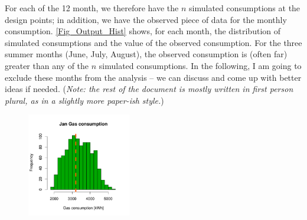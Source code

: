 \documentclass[a4paper, 12pt]{article}
\begin{document}
For each of the 12 month, we therefore have the $n$ simulated consumptions at the design points; in addition, we have the observed piece of data for the monthly consumption.
\autoref{Fig_Output_Hist} shows, for each month, the distribution of simulated consumptions and the value of the observed consumption.
For the three summer months (June, July, August), the observed consumption is (often far) greater than any of the $n$ simulated consumptions. In the following, I am going to exclude these months from the analysis -- we can discuss and come up with better ideas if needed. ({\small \it Note: the rest of the document is mostly written in first person plural, as in a slightly more paper-ish style.})

\newcommand{\scale}{12.2em}
\begin{figure}
\centering
 \includegraphics[width=\scale]{Simulation_histograms/Batch_2_Only/Gas_Runs/Jan_Gas}

\end{figure}
\end{document}
